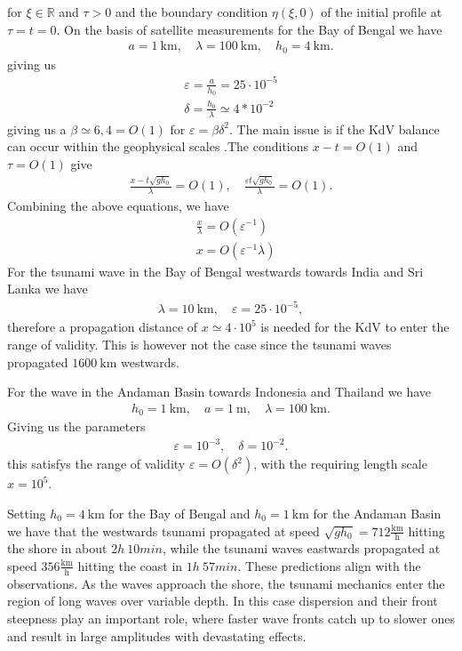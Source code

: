 for $\xi \in \mathbb{R}$ and $\tau > 0 $ and the boundary condition $\eta(\xi
,0)$ of the initial profile at $\tau = t = 0$. On the basis of satellite
measurements for the Bay of Bengal we have
\begin{align}
    a = 1\ \text{km}, \quad \lambda = 100\ \text{km},\quad h_0 = 4\
    \text{km}.
\end{align}
giving us
\begin{align}
    \varepsilon = \frac{a}{h_0} = 25 \cdot 10^{-5}\\
    \delta = \frac{h_0}{\lambda} \simeq 4*10^{-2}
\end{align}
giving us a $\beta \simeq 6,4 = O(1)$ for $\varepsilon = \beta \delta^2$.
The main issue is if the KdV balance can occur within the geophysical scales
.The conditions $x-t = O(1)$ and $\tau = O(1)$ give
\begin{align}
    \frac{x - t \sqrt{gh_0} }{\lambda} = O(1),\quad \frac{\varepsilon t
    \sqrt{gh_0} }{\lambda} = O(1).
\end{align}
Combining the above equations, we have
\begin{align}
   & \frac{x}{\lambda} = O(\varepsilon^{-1})\\
    &x  = O(\varepsilon^{-1}\lambda)
\end{align}
For the tsunami wave in the Bay of Bengal westwards towards India and Sri
Lanka we have
\begin{align}
    \lambda = 10\ \text{km}, \quad \varepsilon = 25 \cdot 10^{-5},
\end{align}
therefore a propagation distance of $x \simeq 4 \cdot 10^{5}$ is needed for
the KdV to enter the range of validity. This is however not the case since
the tsunami waves propagated $1600\ \text{km}$ westwards.

For the wave in the Andaman Basin towards Indonesia and Thailand we have
\begin{align}
    h_0 = 1\ \text{km}, \quad a = 1\ \text{m}, \quad \lambda = 100\
    \text{km}.
\end{align}
Giving us the parameters
\begin{align}
    \varepsilon  = 10^{-3}, \quad \delta = 10^{-2}.
\end{align}
this satisfys the range of validity  $\varepsilon = O(\delta^2)$, with the
requiring length scale $x = 10^{5}$.

Setting $h_0 = 4\ \text{km}$ for the Bay of Bengal and $h_0 = 1\ \text{km}$
for the Andaman Basin we have that the westwards tsunami propagated at speed
$\sqrt{gh_0}  = 712 \frac{\text{km}}{\text{h}}$ hitting the shore in about
$2h\ 10min$, while the tsunami waves eastwards propagated at speed $356
\frac{\text{km}}{\text{h}}$ hitting the coast in $1h\ 57min$. These
predictions align with the observations. As the waves approach the shore, the
tsunami mechanics enter the region of long waves over variable depth. In this
case dispersion and their front steepness play an important role, where
faster wave fronts catch up to slower ones and result in large amplitudes
with devastating effects.









